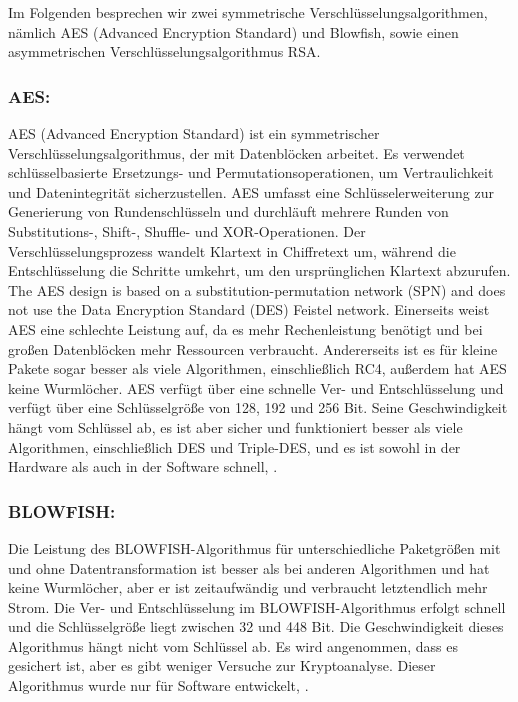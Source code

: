 Im Folgenden besprechen wir zwei symmetrische Verschlüsselungsalgorithmen, nämlich AES (Advanced Encryption Standard) und Blowfish, sowie einen asymmetrischen Verschlüsselungsalgorithmus RSA.


\subsubsection{AES:}

AES (Advanced Encryption Standard) ist ein symmetrischer Verschlüsselungsalgorithmus, der mit Datenblöcken arbeitet. Es verwendet schlüsselbasierte Ersetzungs- und Permutationsoperationen, um Vertraulichkeit und Datenintegrität sicherzustellen. AES umfasst eine Schlüsselerweiterung zur Generierung von Rundenschlüsseln und durchläuft mehrere Runden von Substitutions-, Shift-, Shuffle- und XOR-Operationen. Der Verschlüsselungsprozess wandelt Klartext in Chiffretext um, während die Entschlüsselung die Schritte umkehrt, um den ursprünglichen Klartext abzurufen.\cite{abdullah2017advanced}
The AES design is based on a substitution-permutation network 
(SPN) and does not use the Data Encryption Standard (DES) Feistel network\cite{raghav2016securing}.
Einerseits weist AES eine schlechte Leistung auf, da es mehr Rechenleistung benötigt und bei großen Datenblöcken mehr Ressourcen verbraucht. Andererseits ist es für kleine Pakete sogar besser als viele Algorithmen, einschließlich RC4, außerdem hat AES keine Wurmlöcher.\cite{abdullah2017advanced}
AES verfügt über eine schnelle Ver- und Entschlüsselung und verfügt über eine Schlüsselgröße von 128, 192 und 256 Bit. Seine Geschwindigkeit hängt vom Schlüssel ab, es ist aber sicher und funktioniert besser als viele Algorithmen, einschließlich DES und Triple-DES, und es ist sowohl in der Hardware als auch in der Software schnell\cite{devi2015review}, \cite{abdullah2017advanced}.

\subsubsection{BLOWFISH:}

Die Leistung des BLOWFISH-Algorithmus für unterschiedliche Paketgrößen mit und ohne Datentransformation ist besser als bei anderen Algorithmen und hat keine Wurmlöcher, aber er ist zeitaufwändig und verbraucht letztendlich mehr Strom\cite{thambiraja2012survey}.
Die Ver- und Entschlüsselung im BLOWFISH-Algorithmus erfolgt schnell und die Schlüsselgröße liegt zwischen 32 und 448 Bit. Die Geschwindigkeit dieses Algorithmus hängt nicht vom Schlüssel ab. Es wird angenommen, dass es gesichert ist, aber es gibt weniger Versuche zur Kryptoanalyse. Dieser Algorithmus wurde nur für Software entwickelt\cite{devi2015review}, \cite{thambiraja2012survey}.

